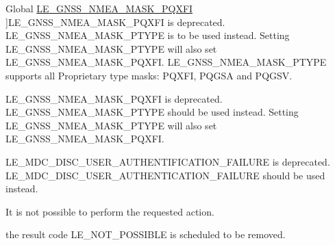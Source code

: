 \begin{DoxyRefList}
\hypertarget{deprecated__deprecated000010}{}%
Global \hyperlink{le__gnss__interface_8h_ad40fd63901477f695a1d5936a5ade316}{L\+E\+\_\+\+G\+N\+S\+S\+\_\+\+N\+M\+E\+A\+\_\+\+M\+A\+S\+K\+\_\+\+P\+Q\+X\+FI} ]L\+E\+\_\+\+G\+N\+S\+S\+\_\+\+N\+M\+E\+A\+\_\+\+M\+A\+S\+K\+\_\+\+P\+Q\+X\+FI is deprecated. L\+E\+\_\+\+G\+N\+S\+S\+\_\+\+N\+M\+E\+A\+\_\+\+M\+A\+S\+K\+\_\+\+P\+T\+Y\+PE is to be used instead. Setting L\+E\+\_\+\+G\+N\+S\+S\+\_\+\+N\+M\+E\+A\+\_\+\+M\+A\+S\+K\+\_\+\+P\+T\+Y\+PE will also set L\+E\+\_\+\+G\+N\+S\+S\+\_\+\+N\+M\+E\+A\+\_\+\+M\+A\+S\+K\+\_\+\+P\+Q\+X\+FI. L\+E\+\_\+\+G\+N\+S\+S\+\_\+\+N\+M\+E\+A\+\_\+\+M\+A\+S\+K\+\_\+\+P\+T\+Y\+PE supports all Proprietary type masks\+: P\+Q\+X\+FI, P\+Q\+G\+SA and P\+Q\+G\+SV.  
\item[\label{deprecated__deprecated000012}%
\hypertarget{deprecated__deprecated000012}{}%
Global \hyperlink{le__gnss__interface_8h_ab9253e29d74cae6e962dcc8b94f0e3c1}{le\+\_\+gnss\+\_\+\+Set\+Nmea\+Sentences} (le\+\_\+gnss\+\_\+\+Nmea\+Bit\+Mask\+\_\+t nmea\+Mask)]L\+E\+\_\+\+G\+N\+S\+S\+\_\+\+N\+M\+E\+A\+\_\+\+M\+A\+S\+K\+\_\+\+P\+Q\+X\+FI is deprecated. L\+E\+\_\+\+G\+N\+S\+S\+\_\+\+N\+M\+E\+A\+\_\+\+M\+A\+S\+K\+\_\+\+P\+T\+Y\+PE should be used instead. Setting L\+E\+\_\+\+G\+N\+S\+S\+\_\+\+N\+M\+E\+A\+\_\+\+M\+A\+S\+K\+\_\+\+P\+T\+Y\+PE will also set L\+E\+\_\+\+G\+N\+S\+S\+\_\+\+N\+M\+E\+A\+\_\+\+M\+A\+S\+K\+\_\+\+P\+Q\+X\+FI.  
\item[\label{deprecated__deprecated000013}%
\hypertarget{deprecated__deprecated000013}{}%
Global \hyperlink{le__mdc__interface_8h_a16f5386bc285f7eb7fdf7faa8cc93813}{L\+E\+\_\+\+M\+D\+C\+\_\+\+D\+I\+S\+C\+\_\+\+U\+S\+E\+R\+\_\+\+A\+U\+T\+H\+E\+N\+T\+I\+F\+I\+C\+A\+T\+I\+O\+N\+\_\+\+F\+A\+I\+L\+U\+RE} ]L\+E\+\_\+\+M\+D\+C\+\_\+\+D\+I\+S\+C\+\_\+\+U\+S\+E\+R\+\_\+\+A\+U\+T\+H\+E\+N\+T\+I\+F\+I\+C\+A\+T\+I\+O\+N\+\_\+\+F\+A\+I\+L\+U\+RE is deprecated. L\+E\+\_\+\+M\+D\+C\+\_\+\+D\+I\+S\+C\+\_\+\+U\+S\+E\+R\+\_\+\+A\+U\+T\+H\+E\+N\+T\+I\+C\+A\+T\+I\+O\+N\+\_\+\+F\+A\+I\+L\+U\+RE should be used instead.  
\item[\label{deprecated__deprecated000005}%
\hypertarget{deprecated__deprecated000005}{}%
Global \hyperlink{le__basics_8h_a1cca095ed6ebab24b57a636382a6c86ca6bff37e5294d5f5be87549661e30844d}{L\+E\+\_\+\+N\+O\+T\+\_\+\+P\+O\+S\+S\+I\+B\+LE} ]It is not possible to perform the requested action.  
\item[\label{deprecated__deprecated000004}%
\hypertarget{deprecated__deprecated000004}{}%
Global \hyperlink{le__basics_8h_a1cca095ed6ebab24b57a636382a6c86c}{le\+\_\+result\+\_\+t} ]the result code L\+E\+\_\+\+N\+O\+T\+\_\+\+P\+O\+S\+S\+I\+B\+LE is scheduled to be removed.  

\end{DoxyRefList}
